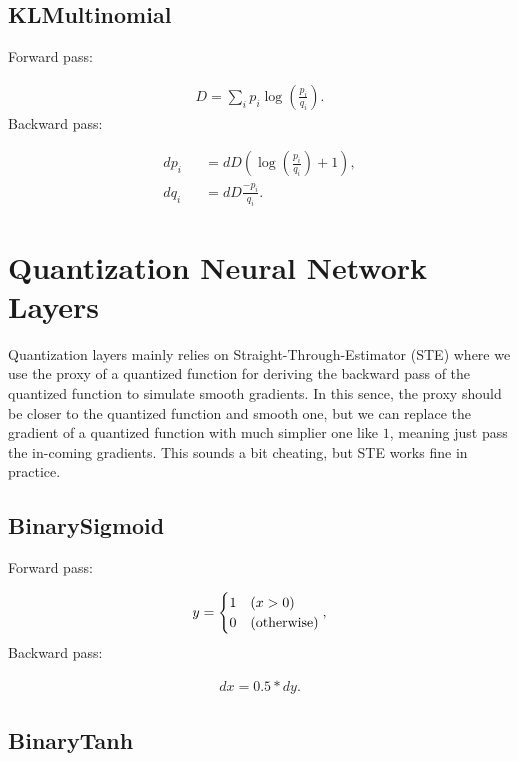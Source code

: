 \documentclass{article}
\begin{document}
\subsection{KLMultinomial}

Forward pass:

\begin{eqnarray}
  D = \sum_i p_i \log \left( \frac{p_i}{q_i} \right).
\end{eqnarray}
%
Backward pass:

\begin{eqnarray}
  dp_i &&= dD \left( \log(\frac{p_i}{q_i}) + 1 \right), \\
  dq_i &&= dD \frac{-p_i}{q_i}.
\end{eqnarray}


\section{Quantization Neural Network Layers}
\label{sec:Quantization Neural Network Layers}

Quantization layers mainly relies on Straight-Through-Estimator (STE) where we use the proxy of a quantized function for deriving the backward pass of the quantized function to simulate smooth gradients. In this sence, the proxy should be closer to the quantized function and smooth one, but we can replace the gradient of a quantized function with much simplier one like $1$, meaning just pass the in-coming gradients. This sounds a bit cheating, but STE works fine in practice.

\subsection{BinarySigmoid}

Forward pass:

\begin{eqnarray}
  y = \begin{cases}
    1 & (x > 0) \\
    0 & ({\rm {\rm otherwise}})\end{cases},
\end{eqnarray}
%
Backward pass:

\begin{eqnarray}
  dx = 0.5 * dy.
\end{eqnarray}


\subsection{BinaryTanh}
\end{document}
